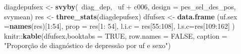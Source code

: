 \documentclass[]{book}
\newenvironment{Shaded}{\begin{snugshade}}{\end{snugshade}}
\newcommand{\KeywordTok}[1]{\textcolor[rgb]{0.13,0.29,0.53}{\textbf{{#1}}}}
\newcommand{\DataTypeTok}[1]{\textcolor[rgb]{0.13,0.29,0.53}{{#1}}}
\newcommand{\DecValTok}[1]{\textcolor[rgb]{0.00,0.00,0.81}{{#1}}}
\newcommand{\StringTok}[1]{\textcolor[rgb]{0.31,0.60,0.02}{{#1}}}
\newcommand{\OtherTok}[1]{\textcolor[rgb]{0.56,0.35,0.01}{{#1}}}
\newcommand{\NormalTok}[1]{{#1}}
\numberwithin{example}{chapter}
\numberwithin{remark}{chapter}
\numberwithin{definition}{chapter}
\begin{document}
\begin{Shaded}
\begin{Highlighting}[]
\NormalTok{diagdepufsex <-}\StringTok{ }\KeywordTok{svyby}\NormalTok{(~diag_dep, ~uf +}\StringTok{ }\NormalTok{c006, }\DataTypeTok{design =} \NormalTok{pes_sel_des_pos, }
  \NormalTok{svymean)}
\NormalTok{res <-}\StringTok{ }\KeywordTok{three_stats}\NormalTok{(diagdepufsex)}
\NormalTok{dfufsex <-}\StringTok{ }\KeywordTok{data.frame} \NormalTok{(}\DataTypeTok{uf.sex =}\KeywordTok{names}\NormalTok{(res)[}\DecValTok{1}\NormalTok{:}\DecValTok{54}\NormalTok{], }\DataTypeTok{prop =} \NormalTok{res[}\DecValTok{1}\NormalTok{:}\StringTok{ }\DecValTok{54}\NormalTok{],}
  \DataTypeTok{l.i.c =} \NormalTok{res[}\DecValTok{55}\NormalTok{:}\DecValTok{108}\NormalTok{], }\DataTypeTok{l.s.c=}\NormalTok{res[}\DecValTok{109}\NormalTok{:}\DecValTok{162}\NormalTok{] )}
\NormalTok{knitr::}\KeywordTok{kable}\NormalTok{(dfufsex,}\DataTypeTok{booktabs =} \OtherTok{TRUE}\NormalTok{, }\DataTypeTok{row.names =} \OtherTok{FALSE}\NormalTok{, }
\DataTypeTok{caption =} \StringTok{"Proporção de diagnóstico de depressão por uf e sexo"}\NormalTok{)}
\end{Highlighting}
\end{Shaded}
\end{document}

